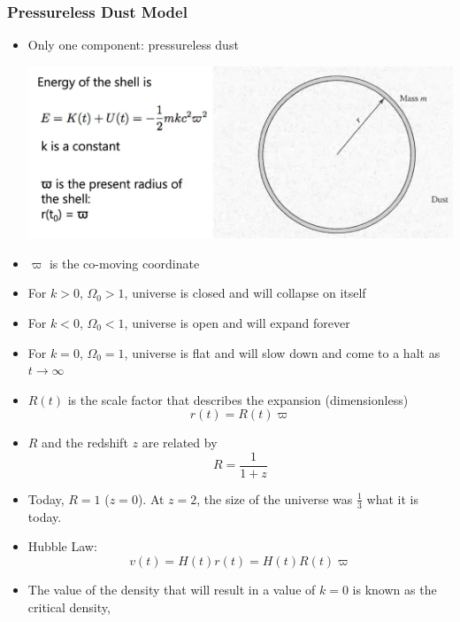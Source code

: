 \documentclass{book}
\begin{document}
\subsubsection{Pressureless Dust Model}
\begin{itemize}
    \item Only one component: pressureless dust
          \begin{center}
              \includegraphics[width = 0.9 \textwidth]{images/cosmo_setup.png}
          \end{center}
    \item $\varpi$ is the co-moving coordinate
    \item For $k > 0$, $\Omega_0 > 1$, universe is closed and will collapse on itself
    \item For $k < 0$, $\Omega_0 < 1$, universe is open and will expand forever
    \item For $k = 0$, $\Omega_0 = 1$, universe is flat and will slow down and come to a halt as $t \to \infty$
    \item $R(t)$ is the scale factor that describes the expansion (dimensionless)
          \begin{equation*}
              r(t) = R(t) \varpi \tag{C\&O 29.3}
          \end{equation*}
    \item $R$ and the redshift $z$ are related by
          \begin{equation*}
              R = \frac{1}{1 + z} \tag{C\&O 29.4}
          \end{equation*}
    \item Today, $R = 1$ ($z = 0$). At $z = 2$, the size of the universe was $\frac{1}{3}$ what it is today.
    \item Hubble Law:
          \begin{equation*}
              v(t) = H(t) r(t) = H(t) R(t) \varpi \tag{C\&O 29.7}
          \end{equation*}
    \item The value of the density that will result in a value of $k = 0$ is known as the critical density,

\end{itemize}
\end{document}
